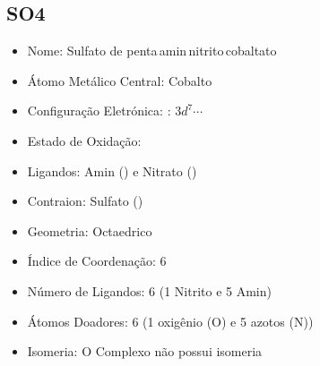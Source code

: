 \documentclass[12pt]{article}
\begin{document}
\noindent\begin{minipage}{\textwidth}

   \subsection{SO4}
   \noindent\begin{itemize}
   \item Nome:	
   	Sulfato de penta\,amin\,nitrito\,cobaltato
   
   \item Átomo Metálico Central: 
   	Cobalto 
   
   \item Configuração Eletrónica: 
   	\ch{[Ar]}: $3d^7\cdots$
   	
   \item Estado de Oxidação:
   
   \item Ligandos: 
   	Amin () e Nitrato ()
   
   \item Contraion: 
   	Sulfato ()
   
   \item Geometria: 
   	Octaedrico
   
   \item Índice de Coordenação: 
   	6
   
   \item Número de Ligandos: 
   	6 (1 Nitrito e 5 Amin)
   
   \item Átomos Doadores: 
   	6 (1 oxigênio (O) e 5 azotos (N))
   
   \item Isomeria:
   	O Complexo não possui isomeria
   
   \end{itemize}
   
\end{minipage}
\end{document}
